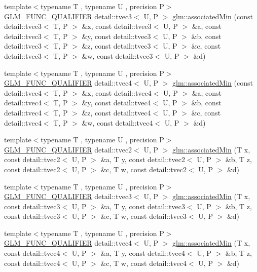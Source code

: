\begin{DoxyCompactItemize}
\item 
{\footnotesize template$<$typename T , typename U , precision P$>$ }\\\hyperlink{setup_8hpp_a33fdea6f91c5f834105f7415e2a64407}{G\+L\+M\+\_\+\+F\+U\+N\+C\+\_\+\+Q\+U\+A\+L\+I\+F\+I\+ER} detail\+::tvec3$<$ U, P $>$ \hyperlink{namespaceglm_a79286a03f67ccb6a58c5afa150cc77b3}{glm\+::associated\+Min} (const detail\+::tvec3$<$ T, P $>$ \&x, const detail\+::tvec3$<$ U, P $>$ \&a, const detail\+::tvec3$<$ T, P $>$ \&y, const detail\+::tvec3$<$ U, P $>$ \&b, const detail\+::tvec3$<$ T, P $>$ \&z, const detail\+::tvec3$<$ U, P $>$ \&c, const detail\+::tvec3$<$ T, P $>$ \&w, const detail\+::tvec3$<$ U, P $>$ \&d)
\item 
{\footnotesize template$<$typename T , typename U , precision P$>$ }\\\hyperlink{setup_8hpp_a33fdea6f91c5f834105f7415e2a64407}{G\+L\+M\+\_\+\+F\+U\+N\+C\+\_\+\+Q\+U\+A\+L\+I\+F\+I\+ER} detail\+::tvec4$<$ U, P $>$ \hyperlink{namespaceglm_a1c1dfb0ea33d7ecc9119cd528438a64c}{glm\+::associated\+Min} (const detail\+::tvec4$<$ T, P $>$ \&x, const detail\+::tvec4$<$ U, P $>$ \&a, const detail\+::tvec4$<$ T, P $>$ \&y, const detail\+::tvec4$<$ U, P $>$ \&b, const detail\+::tvec4$<$ T, P $>$ \&z, const detail\+::tvec4$<$ U, P $>$ \&c, const detail\+::tvec4$<$ T, P $>$ \&w, const detail\+::tvec4$<$ U, P $>$ \&d)
\item 
{\footnotesize template$<$typename T , typename U , precision P$>$ }\\\hyperlink{setup_8hpp_a33fdea6f91c5f834105f7415e2a64407}{G\+L\+M\+\_\+\+F\+U\+N\+C\+\_\+\+Q\+U\+A\+L\+I\+F\+I\+ER} detail\+::tvec2$<$ U, P $>$ \hyperlink{namespaceglm_a748b6d48ac3eee9b1fbf6c13bea30967}{glm\+::associated\+Min} (T x, const detail\+::tvec2$<$ U, P $>$ \&a, T y, const detail\+::tvec2$<$ U, P $>$ \&b, T z, const detail\+::tvec2$<$ U, P $>$ \&c, T w, const detail\+::tvec2$<$ U, P $>$ \&d)
\item 
{\footnotesize template$<$typename T , typename U , precision P$>$ }\\\hyperlink{setup_8hpp_a33fdea6f91c5f834105f7415e2a64407}{G\+L\+M\+\_\+\+F\+U\+N\+C\+\_\+\+Q\+U\+A\+L\+I\+F\+I\+ER} detail\+::tvec3$<$ U, P $>$ \hyperlink{namespaceglm_a8c91e3eddf5a5aa17cad12b291acccd6}{glm\+::associated\+Min} (T x, const detail\+::tvec3$<$ U, P $>$ \&a, T y, const detail\+::tvec3$<$ U, P $>$ \&b, T z, const detail\+::tvec3$<$ U, P $>$ \&c, T w, const detail\+::tvec3$<$ U, P $>$ \&d)
\item 
{\footnotesize template$<$typename T , typename U , precision P$>$ }\\\hyperlink{setup_8hpp_a33fdea6f91c5f834105f7415e2a64407}{G\+L\+M\+\_\+\+F\+U\+N\+C\+\_\+\+Q\+U\+A\+L\+I\+F\+I\+ER} detail\+::tvec4$<$ U, P $>$ \hyperlink{namespaceglm_aaffb9a5ffaedf4b36f8ba5279b1471bd}{glm\+::associated\+Min} (T x, const detail\+::tvec4$<$ U, P $>$ \&a, T y, const detail\+::tvec4$<$ U, P $>$ \&b, T z, const detail\+::tvec4$<$ U, P $>$ \&c, T w, const detail\+::tvec4$<$ U, P $>$ \&d)

\end{DoxyCompactItemize}
